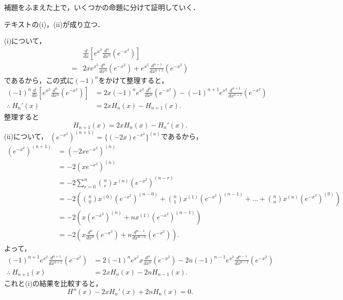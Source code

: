 補題をふまえた上で，いくつかの命題に分けて証明していく．

\begin{proposition}{}{}
  テキストの(i)，(ii)が成り立つ．
\end{proposition}


\begin{tproof}
  (i)について，
  \begin{align*}
      & \frac{d}{dx} \left[ e^{x^2} \frac{d^n}{dx^n} (e^{-x^2} )\right]                      \\
    = & 2x e^{x^2} \frac{d^n}{dx^n} (e^{-x^2}) + e^{x^2} \frac{d^{n+1}}{dx^{n+1}} (e^{-x^2})
  \end{align*}
  であるから，この式に$(-1)^n$をかけて整理すると，
  \begin{align*}
    (-1)^n \frac{d}{dx} \left[ e^{x^2} \frac{d^n}{dx^n} (e^{-x^2} )\right] & = 2x(-1)^n e^{x^2} \frac{d^n}{dx^n} (e^{-x^2}) -(-1)^{n+1} e^{x^2} \frac{d^{n+1}}{dx^{n+1}} (e^{-x^2}) \\
    \therefore ~ H_n ' (x)                                                 & = 2x H_n(x) - H_{n+1}(x).
  \end{align*}
  整理すると
  \[
    H_{n+1}(x) =  2x H_n(x)-H_n'(x).
  \]
  (ii)について，
  $ (e^{-x^2})^{(n+1)} = \{ (-2x)e^{-x^2} \}^{(n)}$であるから，
  \begin{align*}
    (e^{-x^2})^{(n+1)} & = (-2xe^{-x^2})^{(n)}                                                                                                                                  \\
                       & = -2 (xe^{-x^2})^{(n)}                                                                                                                                 \\
                       & = -2 \sum_{r=0}^{n} \binom{n}{r} x^{(n)} (e^{-x^2})^{(n-r)}                                                                                            \\
                       & = -2 \left ( \binom{n}{0} x^{(0)} (e^{-x^2})^{(n-0)} + \binom{n}{1} x^{(1)} (e^{-x^2})^{(n-1)} + \dots + \binom{n}{n} x^{(n)} (e^{-x^2})^{(0)} \right) \\
                       & = -2 \left(  x (e^{-x^2})^{(n)} + n x^{(1)} (e^{-x^2})^{(n-1)} \right)                                                                                 \\
                       & = -2 \left ( x \frac{d^n}{dx^n} (e^{-x^2}) + n \frac{d^{n-1}}{dx^{n-1}} (e^{-x^2}) \right).
  \end{align*}
  よって，
  \begin{align*}
    (-1)^{n+1} e^{x^2} \frac{d^{n+1}}{d x^{n+1}} (e^{-x^2}) & = 2 (-1)^n e^{x^2} x \frac{d^n}{dx^n} (e^{-x^2}) -2 n (-1)^{n-1} e^{x^2}\frac{d^{n-1}}{dx^{n-1}} (e^{-x^2}) \\
    \therefore ~ H_{n+1} (x)                                & = 2x H_n(x) - 2nH_{n-1}(x).
  \end{align*}
  これと(i)の結果を比較すると，
  \[
    H '' (x) - 2x H_n' (x) + 2nH_n (x)=0.
  \]
\end{tproof}

